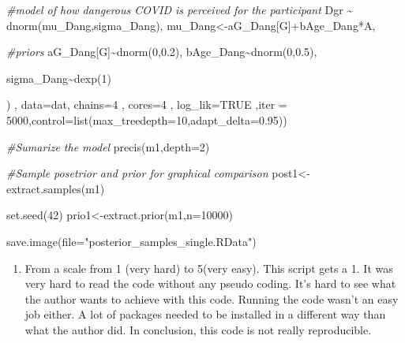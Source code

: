 \documentclass[
]{book}
\newenvironment{Shaded}{\begin{snugshade}}{\end{snugshade}}
\newcommand{\AttributeTok}[1]{\textcolor[rgb]{0.77,0.63,0.00}{#1}}
\newcommand{\CommentTok}[1]{\textcolor[rgb]{0.56,0.35,0.01}{\textit{#1}}}
\newcommand{\ConstantTok}[1]{\textcolor[rgb]{0.00,0.00,0.00}{#1}}
\newcommand{\DecValTok}[1]{\textcolor[rgb]{0.00,0.00,0.81}{#1}}
\newcommand{\FloatTok}[1]{\textcolor[rgb]{0.00,0.00,0.81}{#1}}
\newcommand{\FunctionTok}[1]{\textcolor[rgb]{0.00,0.00,0.00}{#1}}
\newcommand{\NormalTok}[1]{#1}
\newcommand{\OtherTok}[1]{\textcolor[rgb]{0.56,0.35,0.01}{#1}}
\newcommand{\SpecialCharTok}[1]{\textcolor[rgb]{0.00,0.00,0.00}{#1}}
\newcommand{\StringTok}[1]{\textcolor[rgb]{0.31,0.60,0.02}{#1}}
\providecommand{\tightlist}{%
  \setlength{\itemsep}{0pt}\setlength{\parskip}{0pt}}
\begin{document}
\begin{Shaded}
\begin{Highlighting}[]
    \CommentTok{\#model of how dangerous COVID is perceived for the participant}
\NormalTok{    Dgr }\SpecialCharTok{\textasciitilde{}} \FunctionTok{dnorm}\NormalTok{(mu\_Dang,sigma\_Dang),}
\NormalTok{    mu\_Dang}\OtherTok{\textless{}{-}}\NormalTok{aG\_Dang[G]}\SpecialCharTok{+}\NormalTok{bAge\_Dang}\SpecialCharTok{*}\NormalTok{A,}
    
    \CommentTok{\#priors}
\NormalTok{    aG\_Dang[G]}\SpecialCharTok{\textasciitilde{}}\FunctionTok{dnorm}\NormalTok{(}\DecValTok{0}\NormalTok{,}\FloatTok{0.2}\NormalTok{),}
\NormalTok{    bAge\_Dang}\SpecialCharTok{\textasciitilde{}}\FunctionTok{dnorm}\NormalTok{(}\DecValTok{0}\NormalTok{,}\FloatTok{0.5}\NormalTok{),}
    
\NormalTok{    sigma\_Dang}\SpecialCharTok{\textasciitilde{}}\FunctionTok{dexp}\NormalTok{(}\DecValTok{1}\NormalTok{)}
    
\NormalTok{    ) , }\AttributeTok{data=}\NormalTok{dat, }\AttributeTok{chains=}\DecValTok{4}\NormalTok{ , }\AttributeTok{cores=}\DecValTok{4}\NormalTok{ , }\AttributeTok{log\_lik=}\ConstantTok{TRUE}\NormalTok{ ,}\AttributeTok{iter =} \DecValTok{5000}\NormalTok{,}\AttributeTok{control=}\FunctionTok{list}\NormalTok{(}\AttributeTok{max\_treedepth=}\DecValTok{10}\NormalTok{,}\AttributeTok{adapt\_delta=}\FloatTok{0.95}\NormalTok{))}

\CommentTok{\#Sumarize the model}
\FunctionTok{precis}\NormalTok{(m1,}\AttributeTok{depth=}\DecValTok{2}\NormalTok{)}

\CommentTok{\#Sample posetrior and prior for graphical comparison}
\NormalTok{post1}\OtherTok{\textless{}{-}}\FunctionTok{extract.samples}\NormalTok{(m1)}

\FunctionTok{set.seed}\NormalTok{(}\DecValTok{42}\NormalTok{)}
\NormalTok{prio1}\OtherTok{\textless{}{-}}\FunctionTok{extract.prior}\NormalTok{(m1,}\AttributeTok{n=}\DecValTok{10000}\NormalTok{)}

\FunctionTok{save.image}\NormalTok{(}\AttributeTok{file=}\StringTok{"posterior\_samples\_single.RData"}\NormalTok{)}
\end{Highlighting}
\end{Shaded}

\begin{enumerate}
\def\labelenumi{\alph{enumi}.}
\setcounter{enumi}{14}
\tightlist
\item
  From a scale from 1 (very hard) to 5(very easy). This script gets a 1. It was very hard to read the code without any pseudo coding. It's hard to see what the author wants to achieve with this code. Running the code wasn't an easy job either. A lot of packages needed to be installed in a different way than what the author did.
  In conclusion, this code is not really reproducible.
\end{enumerate}
\end{document}
